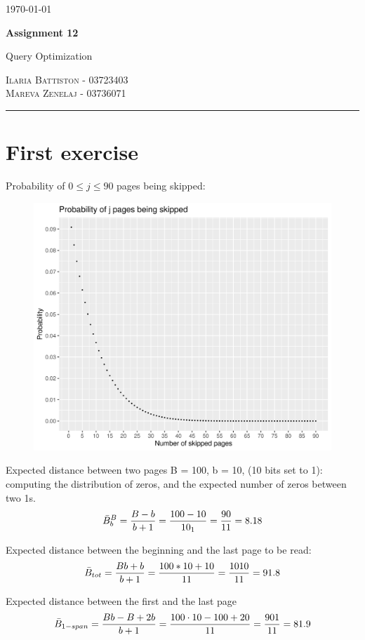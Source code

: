 \documentclass[12pt]{article}
\begin{document}
	\begin{flushright}
		\today
	\end{flushright}
	{\Large \textbf{Assignment 12}}
	
	{\large Query Optimization}
	
	\textsc{Ilaria Battiston - 03723403} \\
	\textsc{Mareva Zenelaj - 03736071}
	
	\rule{\linewidth}{0.5pt}
	
	\section{First exercise}
	Probability of $0 \leq j \leq 90$ pages being skipped:
	\begin{figure}[h]
		\includegraphics[scale=0.7]{plot_skipped.png}
		\centering
	\end{figure}
	    
	Expected distance between two pages B = 100, b = 10, (10 bits set to 1): computing the distribution of zeros, and the expected number of zeros between two 1s.
	$$\Bar{B}_b^B = \frac{B-b}{b+1} = \frac{100-10}{10_1} = \frac{90}{11} = 8.18$$
	    
	Expected distance between the beginning and the last page to be read:
	$$\Bar{B}_{tot} = \frac{Bb +b}{b+1} = \frac{100*10 + 10}{11} = \frac{1010}{11} = 91.8$$
	    
	Expected distance between the first and the last page
	$$\Bar{B}_{1-span} = \frac{Bb-B+2b}{b+1} = \frac{100 \cdot 10-100+20}{11} = \frac{901}{11} =81.9$$
	
\end{document}
